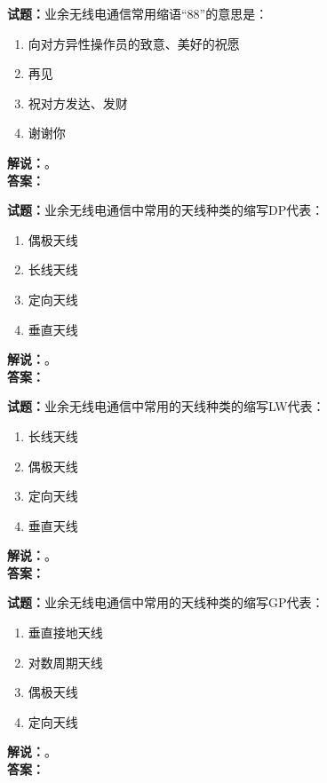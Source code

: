 \documentclass{ctexbook}
\begin{document}
\bigskip




\noindent\textbf{试题：}业余无线电通信常用缩语“88”的意思是：
\begin{enumerate}[leftmargin=3em]
\item 向对方异性操作员的致意、美好的祝愿
\item 再见
\item 祝对方发达、发财
\item 谢谢你
\end{enumerate}
\noindent\textbf{解说：}\textbf{}。\\\noindent\textbf{答案：}

\bigskip




\noindent\textbf{试题：}业余无线电通信中常用的天线种类的缩写DP代表：
\begin{enumerate}[leftmargin=3em]
\item 偶极天线
\item 长线天线
\item 定向天线
\item 垂直天线
\end{enumerate}
\noindent\textbf{解说：}\textbf{}。\\\noindent\textbf{答案：}

\bigskip




\noindent\textbf{试题：}业余无线电通信中常用的天线种类的缩写LW代表：
\begin{enumerate}[leftmargin=3em]
\item 长线天线
\item 偶极天线
\item 定向天线
\item 垂直天线
\end{enumerate}
\noindent\textbf{解说：}\textbf{}。\\\noindent\textbf{答案：}

\bigskip




\noindent\textbf{试题：}业余无线电通信中常用的天线种类的缩写GP代表：
\begin{enumerate}[leftmargin=3em]
\item 垂直接地天线
\item 对数周期天线
\item 偶极天线
\item 定向天线
\end{enumerate}
\noindent\textbf{解说：}\textbf{}。\\\noindent\textbf{答案：}
\end{document}
